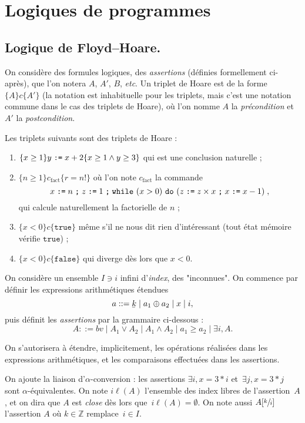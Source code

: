 \documentclass[../main]{subfiles}
\begin{document}
  \chapter{Logiques de programmes}
  \minitoc

  \section{Logique de Floyd--Hoare.}

  On considère des formules logiques, des \textit{assertions} (définies formellement ci-après), que l'on notera $A$, $A'$, $B$, \textit{etc}.
  Un triplet de Hoare est de la forme $\{A\} c \{A'\}$ (la notation est inhabituelle pour les triplets, mais c'est une notation commune dans le cas des triplets de Hoare), où l'on nomme $A$ la \textit{précondition} et $A'$ la \textit{postcondition}.

  \begin{exm}
    Les triplets suivants sont des triplets de Hoare :
    \begin{enumerate}
      \item $\{x \ge 1\} y \mathrel{\texttt{:=}} x + 2 \{x\ge 1 \land y \ge 3\}$ qui est une conclusion naturelle ;
      \item $\{n \ge 1\} c_\text{fact} \{r = n!\}$ où l'on note $c_\text{fact}$ la commande \[
          x \mathrel{\texttt{:=}} n\mathrel{\texttt{;}} z \mathrel{\texttt{:=}} 1 \mathrel{\texttt{;}} \texttt{while}\ (x > 0)\ \texttt{do}\ (z \mathrel{\texttt{:=}} z \times x \mathrel{\texttt{;}} x \mathrel{\texttt{:=}} x - 1)\;
        ,\]
        qui calcule naturellement la factorielle de $n$ ;
      \item $\{x < 0\} c \{\mathtt{true}\}$ même s'il ne nous dit rien d'intéressant (tout état mémoire vérifie $\mathtt{true}$) ;
      \item $\{x < 0\}c \{\mathtt{false}\}$ qui diverge dès lors que $x < 0$.
    \end{enumerate}
  \end{exm}

  On considère un ensemble $I \ni i$ infini d'\textit{index}, des "inconnues".
  On commence par définir les expressions arithmétiques étendues \[
    a ::= \ubar{k}  \mid a_1 \oplus a_2  \mid x  \mid i
  ,\]
  puis définit les \textit{assertions} par la grammaire ci-dessous :
  \[
    A ::= bv  \mid A_1 \lor A_2  \mid A_1 \land A_2 \mid a_1 \ge a_2  \mid \exists i, A
  .\]

  On s'autorisera à étendre, implicitement, les opérations réalisées dans les expressions arithmétiques, et les comparaisons effectuées dans les assertions.

  On ajoute la liaison d'$\alpha$-conversion : les assertions $\exists i, x = 3 * i$ et~$\exists j, x = 3 * j$ sont $\alpha$-équivalentes.
  On note $i\ell(A)$ l'ensemble des index libres de l'assertion~$A$, et on dira que $A$ est \textit{close} dès lors que~$i\ell(A) = \emptyset$.
  On note aussi $A[\sfrac{k}{i}]$ l'assertion $A$ où $k \in \mathds{Z}$ remplace~$i \in I$.
\end{document}
